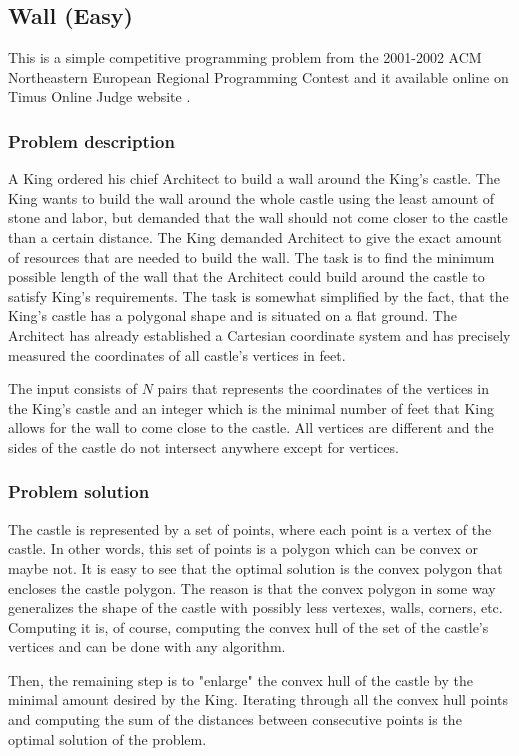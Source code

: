 \documentclass{article}
\begin{document}
\subsection{Wall (Easy)}
This is a simple competitive programming problem from the 2001-2002 ACM Northeastern European Regional Programming Contest and it available online on Timus Online Judge website \cite{wall_problem}.

\subsubsection*{Problem description}
A King ordered his chief Architect to build a wall around the King's castle. The King wants to build the wall around the whole castle using the least amount of stone and labor, but demanded that the wall should not come closer to the castle than a certain distance. The King demanded Architect to give the exact amount of resources that are needed to build the wall.
The task is to find the minimum possible length of the wall that the Architect could build around the castle to satisfy King's requirements.
The task is somewhat simplified by the fact, that the King's castle has a polygonal shape and is situated on a flat ground. The Architect has already established a Cartesian coordinate system and has precisely measured the coordinates of all castle's vertices in feet.

The input consists of $N$ pairs that represents the coordinates of the vertices in the King's castle and an integer which is the minimal number of feet that King allows for the wall to come close to the castle. All vertices are different and the sides of the castle do not intersect anywhere except for vertices.

\subsubsection*{Problem solution}
The castle is represented by a set of points, where each point is a vertex of the castle. In other words, this set of points is a polygon which can be convex or maybe not. It is easy to see that the optimal solution is the convex polygon that encloses the castle polygon. The reason is that the convex polygon in some way generalizes the shape of the castle with possibly less vertexes, walls, corners, etc. Computing it is, of course, computing the convex hull of the set of the castle's vertices and can be done with any algorithm.

Then, the remaining step is to "enlarge" the convex hull of the castle by the minimal amount desired by the King. Iterating through all the convex hull points and computing the sum of the distances between consecutive points is the optimal solution of the problem.
\end{document}
